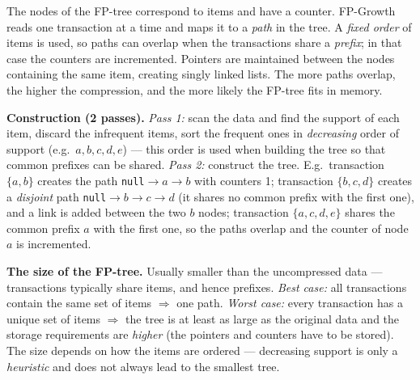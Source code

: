 \documentclass[11pt,a4paper]{article}
\theoremstyle{definition}
\begin{document}
\begin{defbox}
The nodes of the FP-tree correspond to items and have a counter. FP-Growth reads one transaction
at a time and maps it to a \emph{path} in the tree. A \emph{fixed order} of items is used, so
paths can overlap when the transactions share a \emph{prefix}; in that case the counters are
incremented. Pointers are maintained between the nodes containing the same item, creating singly
linked lists. The more paths overlap, the higher the compression, and the more likely the FP-tree
fits in memory.
\end{defbox}

\textbf{Construction (2 passes).} \emph{Pass 1:} scan the data and find the support of each item,
discard the infrequent items, sort the frequent ones in \emph{decreasing} order of support (e.g.\
$a,b,c,d,e$) --- this order is used when building the tree so that common prefixes can be shared.
\emph{Pass 2:} construct the tree. E.g.\ transaction $\{a,b\}$ creates the path
\texttt{null}$\to a\to b$ with counters 1; transaction $\{b,c,d\}$ creates a \emph{disjoint} path
\texttt{null}$\to b\to c\to d$ (it shares no common prefix with the first one), and a link is
added between the two $b$ nodes; transaction $\{a,c,d,e\}$ shares the common prefix $a$ with the
first one, so the paths overlap and the counter of node $a$ is incremented.

\textbf{The size of the FP-tree.} Usually smaller than the uncompressed data --- transactions
typically share items, and hence prefixes. \emph{Best case:} all transactions contain the same set
of items $\Rightarrow$ one path. \emph{Worst case:} every transaction has a unique set of items
$\Rightarrow$ the tree is at least as large as the original data and the storage requirements are
\emph{higher} (the pointers and counters have to be stored). The size depends on how the items
are ordered --- decreasing support is only a \emph{heuristic} and does not always lead to the
smallest tree.
\end{document}
